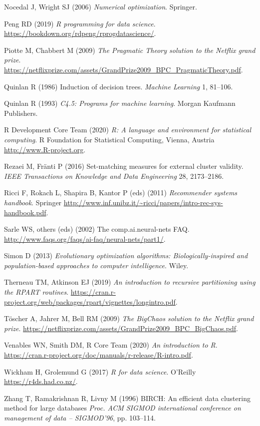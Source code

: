 \documentclass[10pt,b5paper,krantz1]{krantz}
\begin{document}
\leavevmode\hypertarget{ref-nocedal_wright}{}%
Nocedal J, Wright SJ (2006) \emph{Numerical optimization}. Springer.

\leavevmode\hypertarget{ref-rprogdatascience}{}%
Peng RD (2019) \emph{R programming for data science}. \url{https://bookdown.org/rdpeng/rprogdatascience/}.

\leavevmode\hypertarget{ref-pragmatictheory_netflix}{}%
Piotte M, Chabbert M (2009) \emph{The Pragmatic Theory solution to the Netflix grand prize}. \url{https://netflixprize.com/assets/GrandPrize2009_BPC_PragmaticTheory.pdf}.

\leavevmode\hypertarget{ref-id3}{}%
Quinlan R (1986) Induction of decision trees. \emph{Machine Learning} 1, 81--106.

\leavevmode\hypertarget{ref-c45}{}%
Quinlan R (1993) \emph{C4.5: Programs for machine learning}. Morgan Kaufmann Publishers.

\leavevmode\hypertarget{ref-rpoject}{}%
R Development Core Team (2020) \emph{R: A language and environment for statistical computing}. R Foundation for Statistical Computing, Vienna, Austria \url{http://www.R-project.org}.

\leavevmode\hypertarget{ref-external_cluster_validity}{}%
Rezaei M, Fränti P (2016) Set-matching measures for external cluster validity. \emph{IEEE Transactions on Knowledge and Data Engineering} 28, 2173--2186.

\leavevmode\hypertarget{ref-ricci_etal}{}%
Ricci F, Rokach L, Shapira B, Kantor P (eds) (2011) \emph{Recommender systems handbook}. Springer \url{http://www.inf.unibz.it/~ricci/papers/intro-rec-sys-handbook.pdf}.

\leavevmode\hypertarget{ref-aifaq}{}%
Sarle WS, others (eds) (2002) The comp.ai.neural-nets FAQ. \url{http://www.faqs.org/faqs/ai-faq/neural-nets/part1/}.

\leavevmode\hypertarget{ref-evolution}{}%
Simon D (2013) \emph{Evolutionary optimization algorithms: Biologically-inspired and population-based approaches to computer intelligence}. Wiley.

\leavevmode\hypertarget{ref-rpart}{}%
Therneau TM, Atkinson EJ (2019) \emph{An introduction to recursive partitioning using the RPART routines}. \url{https://cran.r-project.org/web/packages/rpart/vignettes/longintro.pdf}.

\leavevmode\hypertarget{ref-bigchaos_netflix}{}%
Töscher A, Jahrer M, Bell RM (2009) \emph{The BigChaos solution to the Netflix grand prize}. \url{https://netflixprize.com/assets/GrandPrize2009_BPC_BigChaos.pdf}.

\leavevmode\hypertarget{ref-Rintro}{}%
Venables WN, Smith DM, R Core Team (2020) \emph{An introduction to R}. \url{https://cran.r-project.org/doc/manuals/r-release/R-intro.pdf}.

\leavevmode\hypertarget{ref-r4ds}{}%
Wickham H, Grolemund G (2017) \emph{R for data science}. O'Reilly \url{https://r4ds.had.co.nz/}.

\leavevmode\hypertarget{ref-birch}{}%
Zhang T, Ramakrishnan R, Livny M (1996) BIRCH: An efficient data clustering method for large databases \emph{Proc. ACM SIGMOD international conference on management of data -- SIGMOD'96}, pp. 103--114.
\end{document}

